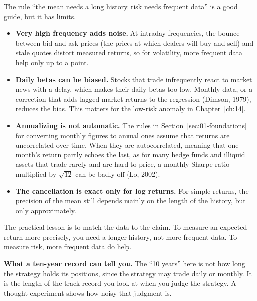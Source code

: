\begin{technote}
The rule ``the mean needs a long history, risk needs frequent data'' is a good guide, but it has limits.
\begin{itemize}
  \item \textbf{Very high frequency adds noise.} At intraday frequencies, the bounce between bid and ask prices (the prices at which dealers will buy and sell) and stale quotes distort measured returns, so for volatility, more frequent data help only up to a point.
  \item \textbf{Daily betas can be biased.} Stocks that trade infrequently react to market news with a delay, which makes their daily betas too low. Monthly data, or a correction that adds lagged market returns to the regression (Dimson, 1979), reduces the bias. This matters for the low-risk anomaly in Chapter~\ref{ch:14}.
  \item \textbf{Annualizing is not automatic.} The rules in Section~\ref{sec:01-foundations} for converting monthly figures to annual ones assume that returns are uncorrelated over time. When they are autocorrelated, meaning that one month's return partly echoes the last, as for many hedge funds and illiquid assets that trade rarely and are hard to price, a monthly Sharpe ratio multiplied by $\sqrt{12}$ can be badly off (Lo, 2002).
  \item \textbf{The cancellation is exact only for log returns.} For simple returns, the precision of the mean still depends mainly on the length of the history, but only approximately.
\end{itemize}
\end{technote}

The practical lesson is to match the data to the claim. To measure an expected return more precisely, you need a longer history, not more frequent data. To measure risk, more frequent data do help.

\textbf{What a ten-year record can tell you.} The ``10 years'' here is not how long the strategy holds its positions, since the strategy may trade daily or monthly. It is the length of the track record you look at when you judge the strategy. A thought experiment shows how noisy that judgment is.

